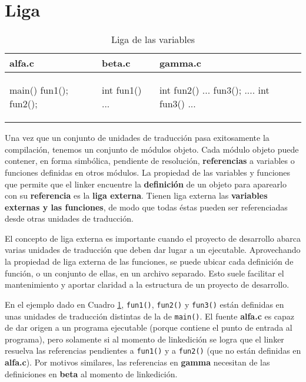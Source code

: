 \section{Liga}

\begin{ejemplo}
\begin{table}
\centering	
\begin{tabular}{l|l|l}
alfa.c & beta.c & gamma.c \\
\hline
\begin{codecell}
main()
{
	fun1();
	fun2();
}
\end{codecell}
&
\begin{codecell}
int fun1()
{
	...
}
\end{codecell}
&
\begin{codecell}
int fun2()
{
	...
	fun3();
	....
}
int fun3()
{
	...
}
\end{codecell}
\\
\end{tabular}
 \caption{Liga de las variables}
 \label{tab:ejliga} 
\end{table}
\end{ejemplo}

Una vez que un conjunto de unidades de traducción pasa exitosamente la compilación, tenemos un
conjunto de módulos objeto. Cada módulo objeto puede contener, en forma simbólica, pendiente de
resolución, \textbf{referencias} a variables o funciones definidas en otros módulos.
La propiedad de las variables y funciones que permite que el linker encuentre la \textbf{definición} de un
objeto para aparearlo con su \textbf{referencia} es la \textbf{liga externa}. Tienen liga externa las \textbf{variables externas y
las funciones}, de modo que todas éstas pueden ser referenciadas desde otras unidades de traducción.

El concepto de liga externa es importante cuando el proyecto de desarrollo abarca varias unidades de
traducción que deben dar lugar a un ejecutable. Aprovechando la propiedad de liga externa de las
funciones, se puede ubicar cada definición de función, o un conjunto de ellas, en un archivo separado.
Esto suele facilitar el mantenimiento y aportar claridad a la estructura de un proyecto de desarrollo.

En el ejemplo dado en Cuadro \ref{tab:ejliga}, \texttt{fun1()}, \texttt{fun2()} y \texttt{fun3()} están definidas en unas unidades de traducción distintas de la de \texttt{main()}. El fuente \textbf{alfa.c} es capaz de dar origen a un programa ejecutable (porque contiene el punto de
entrada al programa), pero solamente si al momento de linkedición se logra que el linker resuelva las
referencias pendientes a \texttt{fun1()} y a \texttt{fun2()} (que no están definidas en \textbf{alfa.c}). Por motivos similares,
las referencias en \textbf{gamma} necesitan de las definiciones en \textbf{beta} al momento de linkedición.

